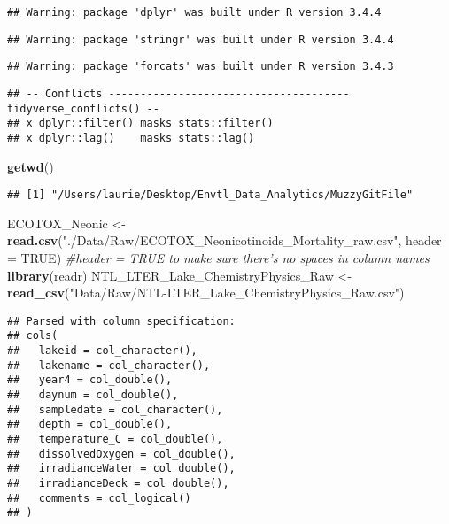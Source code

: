 \documentclass[]{article}
\newenvironment{Shaded}{\begin{snugshade}}{\end{snugshade}}
\newcommand{\KeywordTok}[1]{\textcolor[rgb]{0.13,0.29,0.53}{\textbf{#1}}}
\newcommand{\DataTypeTok}[1]{\textcolor[rgb]{0.13,0.29,0.53}{#1}}
\newcommand{\StringTok}[1]{\textcolor[rgb]{0.31,0.60,0.02}{#1}}
\newcommand{\CommentTok}[1]{\textcolor[rgb]{0.56,0.35,0.01}{\textit{#1}}}
\newcommand{\OtherTok}[1]{\textcolor[rgb]{0.56,0.35,0.01}{#1}}
\newcommand{\NormalTok}[1]{#1}
\begin{document}
\begin{verbatim}
## Warning: package 'dplyr' was built under R version 3.4.4
\end{verbatim}

\begin{verbatim}
## Warning: package 'stringr' was built under R version 3.4.4
\end{verbatim}

\begin{verbatim}
## Warning: package 'forcats' was built under R version 3.4.3
\end{verbatim}

\begin{verbatim}
## -- Conflicts -------------------------------------- tidyverse_conflicts() --
## x dplyr::filter() masks stats::filter()
## x dplyr::lag()    masks stats::lag()
\end{verbatim}

\begin{Shaded}
\begin{Highlighting}[]
\KeywordTok{getwd}\NormalTok{() }
\end{Highlighting}
\end{Shaded}

\begin{verbatim}
## [1] "/Users/laurie/Desktop/Envtl_Data_Analytics/MuzzyGitFile"
\end{verbatim}

\begin{Shaded}
\begin{Highlighting}[]
\NormalTok{ECOTOX_Neonic <-}\StringTok{ }\KeywordTok{read.csv}\NormalTok{(}\StringTok{"./Data/Raw/ECOTOX_Neonicotinoids_Mortality_raw.csv"}\NormalTok{, }\DataTypeTok{header =} \OtherTok{TRUE}\NormalTok{) }\CommentTok{#header = TRUE to make sure there's no spaces in column names}
\KeywordTok{library}\NormalTok{(readr)}
\NormalTok{NTL_LTER_Lake_ChemistryPhysics_Raw <-}\StringTok{ }\KeywordTok{read_csv}\NormalTok{(}\StringTok{"Data/Raw/NTL-LTER_Lake_ChemistryPhysics_Raw.csv"}\NormalTok{)}
\end{Highlighting}
\end{Shaded}

\begin{verbatim}
## Parsed with column specification:
## cols(
##   lakeid = col_character(),
##   lakename = col_character(),
##   year4 = col_double(),
##   daynum = col_double(),
##   sampledate = col_character(),
##   depth = col_double(),
##   temperature_C = col_double(),
##   dissolvedOxygen = col_double(),
##   irradianceWater = col_double(),
##   irradianceDeck = col_double(),
##   comments = col_logical()
## )
\end{verbatim}
\end{document}
